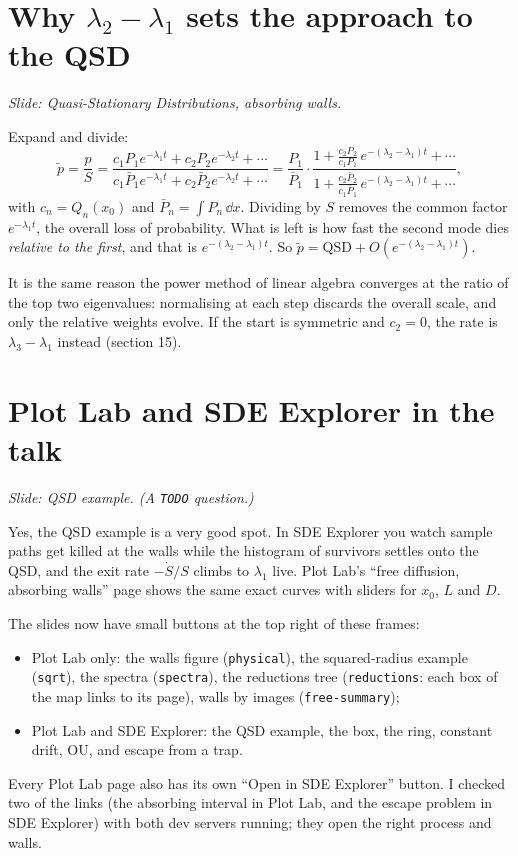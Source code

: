 \documentclass[11pt]{article}
\begin{document}
\section{Why \texorpdfstring{$\lambda_2-\lambda_1$}{lambda2 - lambda1} sets the approach to the QSD}
\emph{Slide: Quasi-Stationary Distributions, absorbing walls.}

Expand and divide:
\[
  \tilde p=\frac pS
  =\frac{c_1P_1e^{-\lambda_1t}+c_2P_2e^{-\lambda_2t}+\cdots}{c_1\bar P_1e^{-\lambda_1t}+c_2\bar P_2e^{-\lambda_2t}+\cdots}
  =\frac{P_1}{\bar P_1}\cdot\frac{1+\frac{c_2P_2}{c_1P_1}\,e^{-(\lambda_2-\lambda_1)t}+\cdots}{1+\frac{c_2\bar P_2}{c_1\bar P_1}\,e^{-(\lambda_2-\lambda_1)t}+\cdots},
\]
with $c_n=Q_n(x_0)$ and $\bar P_n=\int P_n\,\dd x$. Dividing by $S$ removes the common factor $e^{-\lambda_1t}$, the
overall loss of probability. What is left is how fast the second mode dies \emph{relative to the first}, and that is
$e^{-(\lambda_2-\lambda_1)t}$. So $\tilde p=\text{QSD}+O(e^{-(\lambda_2-\lambda_1)t})$.

It is the same reason the power method of linear algebra converges at the ratio of the top two eigenvalues: normalising at
each step discards the overall scale, and only the relative weights evolve. If the start is symmetric and $c_2=0$, the
rate is $\lambda_3-\lambda_1$ instead (section 15).

\section{Plot Lab and SDE Explorer in the talk}
\emph{Slide: QSD example. (A \texttt{TODO} question.)}

Yes, the QSD example is a very good spot. In SDE Explorer you watch sample paths get killed at the walls while the histogram
of survivors settles onto the QSD, and the exit rate $-\dot S/S$ climbs to $\lambda_1$ live. Plot Lab's ``free diffusion,
absorbing walls'' page shows the same exact curves with sliders for $x_0$, $L$ and $D$.

The slides now have small buttons at the top right of these frames:
\begin{itemize}
  \item Plot Lab only: the walls figure (\texttt{physical}), the squared-radius example (\texttt{sqrt}), the spectra
        (\texttt{spectra}), the reductions tree (\texttt{reductions}: each box of the map links to its page), walls by
        images (\texttt{free-summary});
  \item Plot Lab and SDE Explorer: the QSD example, the box, the ring, constant drift, OU, and escape from a trap.
\end{itemize}
Every Plot Lab page also has its own ``Open in SDE Explorer'' button. I checked two of the links (the absorbing interval in
Plot Lab, and the escape problem in SDE Explorer) with both dev servers running; they open the right process and walls.
\end{document}
